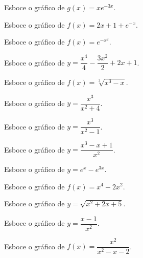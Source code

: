 \begin{exercicio}[6]
Esboce o gráfico de $g(x) = x e^{-3x}$.
\end{exercicio}

\begin{exercicio}[7]
Esboce o gráfico de $f(x) = 2x + 1 + e^{-x}$.
\end{exercicio}

\begin{exercicio}[8]
Esboce o gráfico de $f(x) = e^{-x^2}$.
\end{exercicio}

\begin{exercicio}[9]
Esboce o gráfico de $y = \dfrac{x^4}{4} - \dfrac{3x^2}{2} + 2x + 1$.
\end{exercicio}

\begin{exercicio}[10]
Esboce o gráfico de $f(x) = \sqrt[3]{x^3 - x}$.
\end{exercicio}

\begin{exercicio}[11]
Esboce o gráfico de $y = \dfrac{x^3}{x^2 + 4}$.
\end{exercicio}

\begin{exercicio}[12]
Esboce o gráfico de $y = \dfrac{x^3}{x^2 - 1}$.
\end{exercicio}

\begin{exercicio}[13]
Esboce o gráfico de $y = \dfrac{x^3 - x + 1}{x^2}$.
\end{exercicio}

\begin{exercicio}[14]
Esboce o gráfico de $y = e^x - e^{3x}$.
\end{exercicio}

\begin{exercicio}[15]
Esboce o gráfico de $f(x) = x^4 - 2x^2$.
\end{exercicio}

\begin{exercicio}[16]
Esboce o gráfico de $y = \sqrt{x^2 + 2x + 5}$.
\end{exercicio}

\begin{exercicio}[17]
Esboce o gráfico de $y = \dfrac{x - 1}{x^2}$.
\end{exercicio}

\begin{exercicio}[18]
Esboce o gráfico de $f(x) = \dfrac{x^2}{x^2 - x - 2}$.
\end{exercicio}

